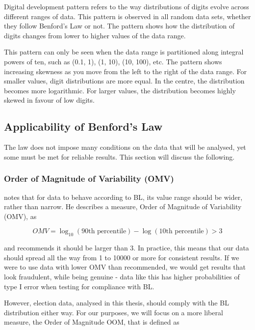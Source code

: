 Digital development pattern refers to the way distributions of digits evolve across different ranges of data. This pattern is observed in all random data sets, whether they follow Benford's Law or not. The pattern shows how the distribution of digits changes from lower to higher values of the data range. 

This pattern can only be seen when the data range is partitioned along integral powers of ten, such as (0.1, 1), (1, 10), (10, 100), etc. The pattern shows increasing skewness as you move from the left to the right of the data range. For smaller values, digit distributions are more equal. In the centre, the distribution becomes more logarithmic. For larger values, the distribution becomes highly skewed in favour of low digits. \cite{kossovsky2014benford}


\subsection{Applicability of Benford's Law}

The law does not impose many conditions on the data that will be analysed, yet some must be met for reliable results. This section will discuss the following. 

\subsubsection*{Order of Magnitude of Variability (OMV)}

\citeauthor{kossovsky2014benford} notes that for data to behave according to BL, its value range should be wider, rather than narrow. He describes a measure, Order of Magnitude of Variability (OMV), as 

\begin{equation}
    OMV = \log_{10}(\text{90th percentile}) - \log(\text{10th percentile}) > 3 
    \label{OMV}
\end{equation}

and recommends it should be larger than 3. In practice, this means that our data should spread all the way from 1 to 10000 or more for consistent results. If we were to use data with lower OMV than recommended, we would get results that look fraudulent, while being genuine - data like this has higher probabilities of type I error when testing for compliance with BL.

However, election data, analysed in this thesis, should comply with the BL distribution either way. For our purposes, we will focus on a more liberal measure, the Order of Magnitude OOM, that is defined as

